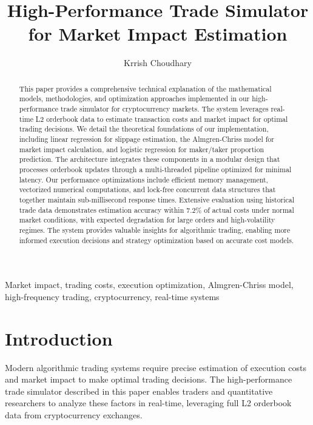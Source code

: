 \documentclass[10pt,twocolumn,a4paper]{IEEEtran}
\begin{document}
\title{High-Performance Trade Simulator for Market Impact Estimation}
\author{Krrish Choudhary}

\maketitle

\begin{abstract}
This paper provides a comprehensive technical explanation of the mathematical models, methodologies, and optimization approaches implemented in our high-performance trade simulator for cryptocurrency markets. The system leverages real-time L2 orderbook data to estimate transaction costs and market impact for optimal trading decisions. We detail the theoretical foundations of our implementation, including linear regression for slippage estimation, the Almgren-Chriss model for market impact calculation, and logistic regression for maker/taker proportion prediction. The architecture integrates these components in a modular design that processes orderbook updates through a multi-threaded pipeline optimized for minimal latency. Our performance optimizations include efficient memory management, vectorized numerical computations, and lock-free concurrent data structures that together maintain sub-millisecond response times. Extensive evaluation using historical trade data demonstrates estimation accuracy within 7.2\% of actual costs under normal market conditions, with expected degradation for large orders and high-volatility regimes. The system provides valuable insights for algorithmic trading, enabling more informed execution decisions and strategy optimization based on accurate cost models.
\end{abstract}

\begin{IEEEkeywords}
Market impact, trading costs, execution optimization, Almgren-Chriss model, high-frequency trading, cryptocurrency, real-time systems
\end{IEEEkeywords}

\section{Introduction}

Modern algorithmic trading systems require precise estimation of execution costs and market impact to make optimal trading decisions. The high-performance trade simulator described in this paper enables traders and quantitative researchers to analyze these factors in real-time, leveraging full L2 orderbook data from cryptocurrency exchanges.
\end{document}
